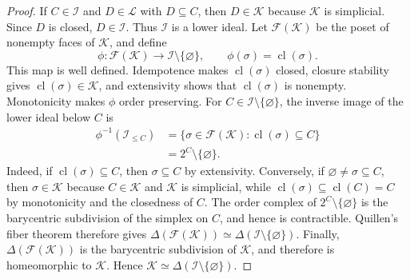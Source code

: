 \documentclass[11pt]{amsart}
\newtheorem{lemma}[theorem]{Lemma}
\theoremstyle{definition}
\newcommand{\cl}{\operatorname{cl}}
\newcommand{\cL}{\mathcal L}
\newcommand{\cI}{\mathcal I}
\begin{document}
\begin{proof}
If $C\in\cI$ and $D\in\cL$ with $D\subseteq C$, then $D\in\mathcal K$ because $\mathcal K$ is simplicial. Since $D$ is closed, $D\in\cI$. Thus $\cI$ is a lower ideal. Let $\mathcal F(\mathcal K)$ be the poset of nonempty faces of $\mathcal K$, and define
\[
\phi\colon\mathcal F(\mathcal K)
\longrightarrow
\cI\setminus\{\varnothing\},
\qquad
\phi(\sigma)=\cl(\sigma).
\]
This map is well defined. Idempotence makes $\cl(\sigma)$ closed, closure stability gives $\cl(\sigma)\in\mathcal K$, and extensivity shows that $\cl(\sigma)$ is nonempty. Monotonicity makes $\phi$ order preserving. For $C\in\cI\setminus\{\varnothing\}$, the inverse image of the lower ideal below $C$ is
\[
\begin{aligned}
\phi^{-1}(\cI_{\le C})
&=
\{\sigma\in\mathcal F(\mathcal K):
\cl(\sigma)\subseteq C\}\\
&=
2^C\setminus\{\varnothing\}.
\end{aligned}
\]
Indeed, if $\cl(\sigma)\subseteq C$, then $\sigma\subseteq C$ by extensivity. Conversely, if $\varnothing\ne\sigma\subseteq C$, then $\sigma\in\mathcal K$ because $C\in\mathcal K$ and $\mathcal K$ is simplicial, while $\cl(\sigma)\subseteq\cl(C)=C$ by monotonicity and the closedness of $C$. The order complex of $2^C\setminus\{\varnothing\}$ is the barycentric subdivision of the simplex on $C$, and hence is contractible. Quillen's fiber theorem \cite[Theorem~A]{Quillen} therefore gives $\Delta(\mathcal F(\mathcal K))\simeq\Delta(\cI\setminus\{\varnothing\})$. Finally, $\Delta(\mathcal F(\mathcal K))$ is the barycentric subdivision of $\mathcal K$, and therefore is homeomorphic to $\mathcal K$. Hence $\mathcal K\simeq\Delta(\cI\setminus\{\varnothing\})$.
\end{proof}
\end{document}
